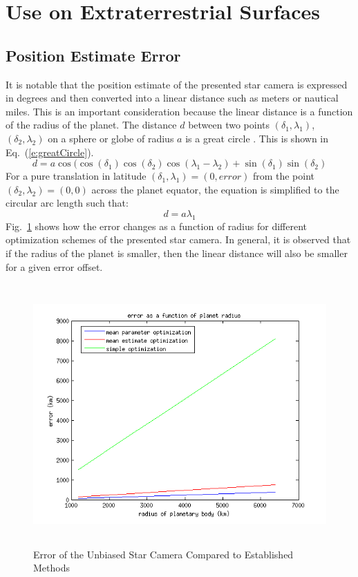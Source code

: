 \documentclass[12pt,a4paper]{book}
\begin{document}
\section{Use on Extraterrestrial Surfaces}
\subsection*{Position Estimate Error}
It is notable that the position estimate of the presented star camera is expressed in degrees and then converted into a linear distance such as meters or nautical miles.  This is an important consideration because the linear distance is a function of the radius of the planet.  The distance $d$ between two points $(\delta_{1}, \lambda_{1})$, $(\delta_{2}, \lambda_{2})$ on a sphere or globe of radius $a$ is a great circle \cite{b:greatCircle}. This is shown in Eq.~(\ref{e:greatCircle}).
\begin{equation}
d = a\cos(\cos(\delta_{1})\cos(\delta_{2})\cos(\lambda_{1} - \lambda_{2}) + \sin(\delta_{1})\sin(\delta_{2})
\label{e:greatCircle}
\end{equation}
For a pure translation in latitude $(\delta_{1}, \lambda_{1}) = (0,error)$ from the point $(\delta_{2}, \lambda_{2}) = (0,0)$ across the planet equator, the equation is simplified to the circular arc length such that:
\begin{equation}
d = a\lambda_{1}
\label{e:circleArc}
\end{equation}
Fig.~\ref{f:errorArc} shows how the error changes as a function of radius for different optimization schemes of the presented star camera.  In general, it is observed that if the radius of the planet is smaller, then the linear distance will also be smaller for a given error offset.
\begin{figure}[!ht]
\centering
\includegraphics[height=10cm]{errorArc.png}
\caption{Error of the Unbiased Star Camera Compared to Established Methods}\label{f:errorArc}
\end{figure}
 
\end{document}
